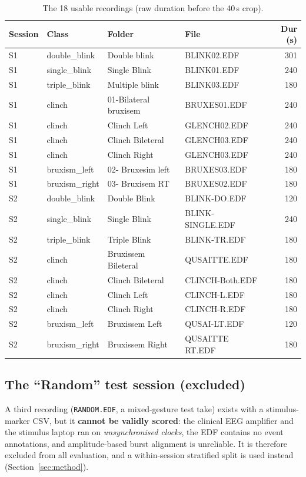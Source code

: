 \documentclass[11pt,a4paper]{article}
\newcommand{\code}[1]{\texttt{#1}}
\begin{document}
\begin{table}[h]
\centering
\caption{The 18 usable recordings (raw duration before the 40\,s crop).}
\label{tab:recordings}
\small
\begin{tabular}{@{}llllr@{}}
\toprule
Session & Class & Folder & File & Dur (s) \\
\midrule
S1 & double\_blink  & Double blink          & BLINK02.EDF      & 301 \\
S1 & single\_blink  & Single Blink          & BLINK01.EDF      & 240 \\
S1 & triple\_blink  & Multiple blink        & BLINK03.EDF      & 180 \\
S1 & clinch         & 01-Bilateral bruxisem & BRUXES01.EDF     & 240 \\
S1 & clinch         & Clinch Left           & GLENCH02.EDF     & 240 \\
S1 & clinch         & Clinch Bileteral      & GLENCH03.EDF     & 240 \\
S1 & clinch         & Clinch Right          & GLENCH03.EDF     & 240 \\
S1 & bruxism\_left  & 02- Bruxesim left     & BRUXES03.EDF     & 180 \\
S1 & bruxism\_right & 03- Bruxisem RT       & BRUXES02.EDF     & 180 \\
S2 & double\_blink  & Double Blink          & BLINK-DO.EDF     & 120 \\
S2 & single\_blink  & Single Blink          & BLINK-SINGLE.EDF & 240 \\
S2 & triple\_blink  & Triple Blink          & BLINK-TR.EDF     & 180 \\
S2 & clinch         & Bruxissem Bileteral   & QUSAITTE.EDF     & 180 \\
S2 & clinch         & Clinch Bileteral      & CLINCH-Both.EDF  & 180 \\
S2 & clinch         & Clinch Left           & CLINCH-L.EDF     & 180 \\
S2 & clinch         & Clinch Right          & CLINCH-R.EDF     & 180 \\
S2 & bruxism\_left  & Bruxissem Left        & QUSAI-LT.EDF     & 120 \\
S2 & bruxism\_right & Bruxissem Right       & QUSAITTE RT.EDF  & 180 \\
\bottomrule
\end{tabular}
\end{table}

\subsection{The ``Random'' test session (excluded)}
A third recording (\code{RANDOM.EDF}, a mixed-gesture test take) exists with a
stimulus-marker CSV, but it \textbf{cannot be validly scored}: the clinical EEG
amplifier and the stimulus laptop ran on \emph{unsynchronised clocks}, the EDF
contains no event annotations, and amplitude-based burst alignment is
unreliable. It is therefore excluded from all evaluation, and a within-session
stratified split is used instead (Section~\ref{sec:method}).
\end{document}
